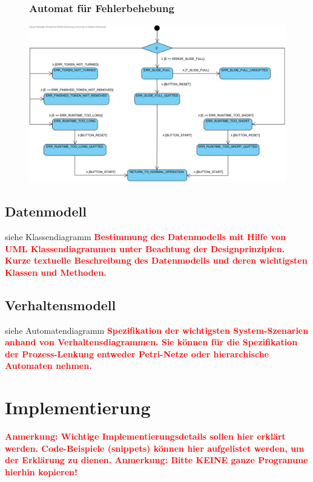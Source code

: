\documentclass[oneside,a4paper,titlepage]{scrartcl} %
\begin{document}
\begin{figure}
	\subsubsection{Automat für Fehlerbehebung}
	\centering\vfill\includegraphics[angle=0,scale=0.6]{imgs/Error_FSM.png}
\end{figure}

\newpage

\subsection{Datenmodell}
siehe Klassendiagramm \newline
\textcolor{red}{\textbf{Bestimmung des Datenmodells mit Hilfe von UML Klassendiagrammen
unter Beachtung der Designprinzipien. Kurze textuelle Beschreibung des Datenmodells und
deren wichtigsten Klassen und Methoden.}}

\subsection{Verhaltensmodell}
siehe Automatendiagramm \newline
\textcolor{red}{\textbf{Spezifikation der wichtigsten System-Szenarien anhand von Verhaltensdiagrammen.
Sie können für die Spezifikation der Prozess-Lenkung entweder Petri-Netze oder hierarchische Automaten nehmen.}}

\newpage

\section{Implementierung}
\textcolor{red}{\textbf{Anmerkung: Wichtige Implementierungsdetails sollen hier erklärt werden.
Code-Beispiele (snippets) können hier aufgelistet werden, um der Erklärung zu dienen.
Anmerkung: Bitte KEINE ganze Programme hierhin kopieren!}}
\end{document}
